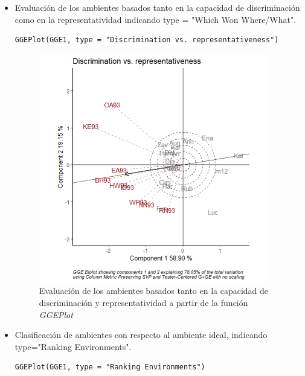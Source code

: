 \begin{itemize}
\item Evaluación de los ambientes basados tanto en la capacidad de discriminación como en la representatividad indicando type = "Which Won Where/What".

\begin{lstlisting}
GGEPlot(GGE1, type = "Discrimination vs. representativeness")
\end{lstlisting}

\begin{figure}[h]
	\begin{center}
		\includegraphics[width=10cm]{./Graficos/Discriminationvsrepresentativeness.png}
	\end{center}
	\caption{Evaluación de los ambientes basados tanto en la capacidad de discriminación y representatividad a partir de la función \emph{GGEPlot}}
\end{figure}



\item Clasificación de ambientes con respecto al ambiente ideal, indicando type="Ranking Environments".

\begin{lstlisting}
GGEPlot(GGE1, type = "Ranking Environments")
\end{lstlisting}


\end{itemize}
